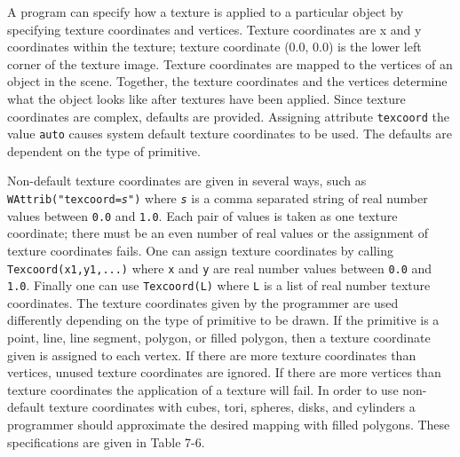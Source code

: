 A program can specify how a texture is applied to a particular object
by specifying texture coordinates and vertices. Texture coordinates
are x and y coordinates within the texture; texture coordinate (0.0,
0.0) is the lower left corner of the texture image. Texture
coordinates are mapped to the vertices of an object in the
scene. Together, the texture coordinates and the vertices determine
what the object looks like after textures have been applied.  Since
texture coordinates are complex, defaults are provided. Assigning
attribute \texttt{texcoord} the value \texttt{auto} causes system
default texture coordinates to be used. The defaults are dependent on
the type of primitive.

Non-default texture coordinates are given in several ways, such as \linebreak
\texttt{WAttrib("texcoord=}\texttt{\textit{s"}}\texttt{)}
where \texttt{\textit{s}} is a comma separated string of real number
values between \texttt{0.0} and \texttt{1.0}. Each pair of values is
taken as one texture coordinate; there must be an even number of real
values or the assignment of texture coordinates fails. One
can assign texture coordinates by calling \texttt{Texcoord(x1,y1,...)}
where \texttt{x} and \texttt{y} are real number values between
\texttt{0.0} and \texttt{1.0}. Finally one can use \texttt{Texcoord(L)}
where \texttt{L} is a list of real number texture coordinates. The
texture coordinates given by the programmer are used differently
depending on the type of primitive to be drawn. If the primitive is a
point, line, line segment, polygon, or filled polygon, then a texture
coordinate given is assigned to each vertex. If there are more texture
coordinates than vertices, unused texture coordinates are ignored. If
there are more vertices than texture coordinates the application of a
texture will fail. In order to use non-default texture coordinates
with cubes, tori, spheres, disks, and cylinders a programmer should
approximate the desired mapping with filled polygons. These
specifications are given in Table 7-6.


